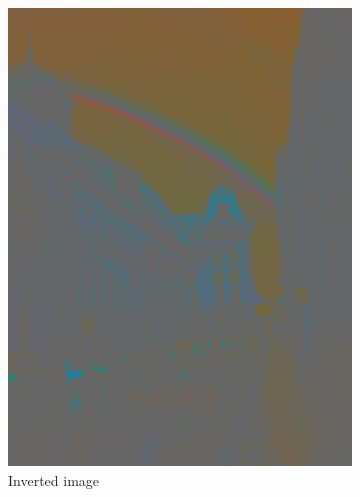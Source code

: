 \documentclass[a4paper]{article}
\begin{document}
\begin{figure}[H]
	\vspace{3mm}
	\begin{subfigure}[h]{0.48\textwidth}
		\centering
		\includegraphics[width=\textwidth]{rainbow_inv}
		\caption*{Inverted image}
	\end{subfigure}
	~
	\begin{subfigure}[h]{0.48\textwidth}
		\centering

\end{subfigure}
\end{figure}
\end{document}
